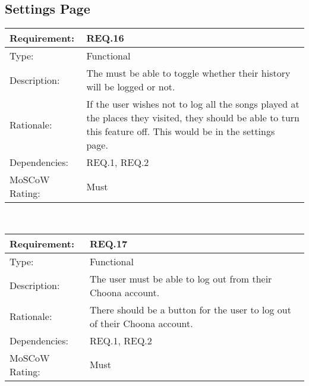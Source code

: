 \vspace{0.5cm}
\subsection*{Settings Page}

\noindent
\begin{tabular}{|l || p{12.0cm}|}
  \hline
  Requirement:       & REQ.16 \\ \hline
  Type:              & Functional \\ \hline
  Description:       & The must be able to toggle whether their history will be logged or not.   \\ \hline
  Rationale:         & If the user wishes not to log all the songs played at the places they visited, they should be able to turn this feature off. This would be in the settings page. \\ \hline
  Dependencies:      & REQ.1, REQ.2 \\ \hline
  MoSCoW Rating:     & Must \\ \hline
\end{tabular}\\

\vspace{0.5cm}

\noindent
\begin{tabular}{|l || p{12.0cm}|}
  \hline
  Requirement:       & REQ.17 \\ \hline
  Type:              & Functional \\ \hline
  Description:       & The user must be able to log out from their Choona account.   \\ \hline
  Rationale:         & There should be a button for the user to log out of their Choona account.  \\ \hline
  Dependencies:      & REQ.1, REQ.2 \\ \hline
  MoSCoW Rating:     & Must \\ \hline
\end{tabular}\\

